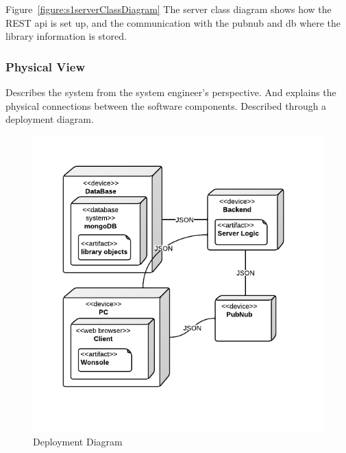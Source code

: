 Figure~\ref{figure:s1serverClassDiagram} The server class diagram shows how the REST api is set up, and the communication with the pubnub and db where the library information is stored.






\subsubsection{Physical View}
Describes the system from the system engineer's perspective. And explains the physical connections between the software components. Described through a deployment diagram. 

\begin{figure}[h]
\centering
\includegraphics[width=5in]{image/architecture/s1/s1DeploymentDiagram.png}
\caption{Deployment Diagram}
\label{figure:s1DeploymentDiagram}
\end{figure}

